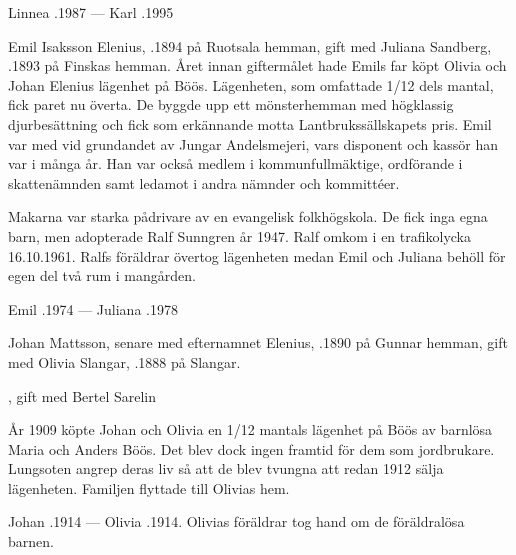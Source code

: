 Linnea .1987 --- Karl .1995



%



%
Emil Isaksson Elenius, .1894 på Ruotsala hemman, gift med Juliana Sandberg, .1893 på Finskas hemman. Året innan giftermålet hade Emils far köpt Olivia och Johan Elenius lägenhet på Böös. Lägenheten, som omfattade 1/12 dels mantal, fick	paret nu överta. De byggde upp ett mönsterhemman med högklassig djurbesättning och fick som erkännande motta Lantbrukssällskapets pris. Emil var med vid grundandet av Jungar Andelsmejeri, vars disponent och kassör han var i många år. Han var också medlem i kommunfullmäktige, ordförande i skattenämnden samt ledamot i andra nämnder och kommittéer.

Makarna var starka pådrivare av en evangelisk folkhögskola. De fick inga egna barn, men adopterade Ralf Sunngren år 1947. Ralf omkom i en trafikolycka 16.10.1961. Ralfs föräldrar övertog lägenheten medan Emil och Juliana behöll för egen del två rum i mangården.

Emil .1974  ---  Juliana .1978


%
Johan Mattsson, senare med efternamnet Elenius,  .1890 på Gunnar hemman, gift med Olivia Slangar, .1888 på Slangar.
\begin{jhchildren}
  \item {}
  \item {}, gift med Bertel Sarelin
\end{jhchildren}
År 1909 köpte Johan och Olivia en 1/12 mantals lägenhet på Böös av barnlösa Maria och Anders Böös. Det blev dock ingen framtid för dem som jordbrukare. Lungsoten angrep deras liv så att de blev tvungna att redan 1912 sälja lägenheten. Familjen flyttade till Olivias hem.

Johan .1914  ---  Olivia .1914. Olivias föräldrar tog hand om de föräldralösa barnen.


